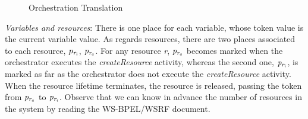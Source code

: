 \begin{figure}[!ht]
\begin{center}
\end{center}
\vspace{-0.65cm}
\caption{Orchestration Translation}\label{orchestator}
\end{figure}

 


{\it Variables and resources}: There is one place for each variable, whose token value is the current variable value. As regards resources, there are two places associated to each resource, $p_{\it r_i}$, $p_{\it r_a}$. For
any resource {\it r}, ${\it p_{r_a}}$ becomes marked when the orchestrator executes the \emph{createResource} activity, whereas the second one, ${\it p_{r_i}}$, is marked as far as the orchestrator does not execute the \emph{createResource} activity. When the resource lifetime terminates, the resource is released, passing the token from ${\it p_{r_a}}$ to ${\it p_{r_i}}$. Observe that we can know in advance the number of resources in the system by reading the WS-BPEL/WSRF document.

